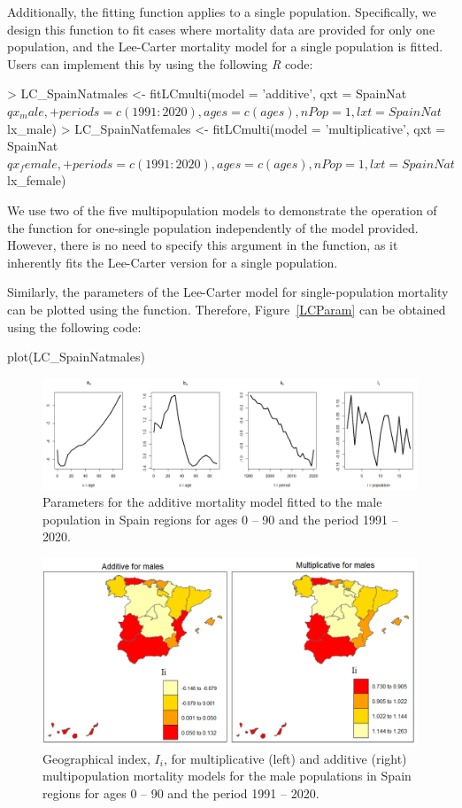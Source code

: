 Additionally, the fitting function applies to a single population. Specifically, we design this function to fit cases where mortality data are provided for only one population, and the Lee-Carter mortality model for a single population is fitted. Users can implement this by using the following \emph{R} code:
%
\begin{example}
> LC_SpainNatmales <- fitLCmulti(model = 'additive', qxt = SpainNat$qx_male,
+	periods = c(1991:2020), ages = c(ages), nPop = 1, lxt = SpainNat$lx_male)
> LC_SpainNatfemales <- fitLCmulti(model = 'multiplicative', qxt = SpainNat$qx_female,
+	periods = c(1991:2020), ages = c(ages), nPop = 1, lxt = SpainNat$lx_female)
\end{example}
%
We use two of the five multipopulation models to demonstrate the operation of the function for one-single population independently of the model provided. However, there is no need to specify this argument in the  function, as it inherently fits the Lee-Carter version for a single population.

Similarly, the parameters of the Lee-Carter model for single-population mortality can be plotted using the  function. Therefore, Figure~\ref{LCParam} can be obtained using the following code:
%
\begin{example}
plot(LC_SpainNatmales)
\end{example}
%

\begin{figure}[h!]
\includegraphics*[width=\textwidth]{parametros_Addit_male.png}
\caption{Parameters for the additive mortality model fitted to the male population in Spain regions for ages 0 – 90 and the period 1991 – 2020.}
\label{AdditiveParam}
\centering
\end{figure}

\begin{figure}[h!]
\centering
\includegraphics*[width=\textwidth]{Ii_males.png}
\caption{Geographical index, $I_i$, for multiplicative (left) and additive (right) multipopulation mortality models for the male populations in Spain regions for ages 0 – 90 and the period 1991 – 2020.}
\label{Iiparams}
\end{figure}

